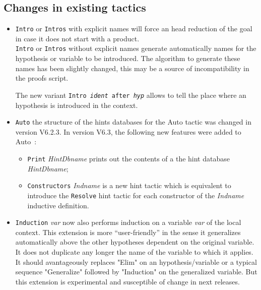 \documentclass[11pt]{article}
\begin{document}
\subsection{Changes in existing tactics}

  \begin{itemize}

  \item \texttt{Intro} or \texttt{Intros} with explicit names 
   will force an head reduction of the goal in case it does not start
   with a product. \\
   
\texttt{Intro} or \texttt{Intros} without explicit names
   generate automatically names for the hypothesis or
   variable to be introduced. The algorithm to generate these names
   has been slightly changed, this may be a source of incompatibility in the
   proofs script.

  The new variant \texttt{Intro \textit{ident} after \textit{hyp}} allows to
  tell the place where an hypothesis is introduced in the context.

  \item \texttt{Auto} the structure of the hints databases for the Auto
   tactic was changed in version V6.2.3. 
   In version V6.3, the following new features were added to Auto~:
   \begin{itemize}
   \item \texttt{Print} \textit{HintDbname} prints out the contents of
        a the hint database \textit{HintDbname};
      \item \texttt{Constructors} \textit{Indname} is a new hint
        tactic which is equivalent to introduce the \texttt{Resolve}
        hint tactic for each
        constructor of the \textit{Indname} inductive definition.
   \end{itemize}

  \item \texttt{Induction} \textit{var} now also performs induction on
    a variable \textit{var} of the local context. This extension is
    more ``user-friendly'' in the sense it generalizes automatically
    above the other hypotheses dependent on the original variable. It
    does not duplicate any longer the name of the variable to which it
    applies. It should avantageously replaces "Elim" on an
    hypothesis/variable or a typical sequence "Generalize" followed by
    "Induction" on the generalized variable. But this extension is
    experimental and susceptible of change in next releases.


\end{itemize}
\end{document}
